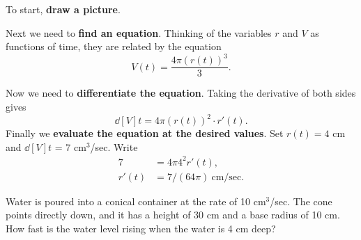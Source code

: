 \documentclass{ximera}
\begin{document}
\begin{solution}
To start, \textbf{draw a picture}.


Next we need to \textbf{find an equation}.  Thinking of the variables
$r$ and $V$ as functions of time, they are related by the equation
\[
V(t)=\frac{4\pi (r(t))^3}{3}.
\]

Now we need to \textbf{differentiate the equation}.  Taking the
derivative of both sides gives 
\[
\dd[V]{t}=4\pi (r(t))^2\cdot r'(t).
\]  
Finally we \textbf{evaluate the equation at the desired values}. Set
$r(t)= 4$ cm and $\dd[V]{t}$ = 7 cm$^3$/sec. Write 
\begin{align*}
7 &=4\pi 4^2r'(t),\\
r'(t) &=7/(64\pi)~\text{cm/sec}.
\end{align*}
\end{solution}

\begin{example} Water is poured into a conical container at the rate of 10
cm${}^3$/sec.  The cone points directly down, and it has a height of
30 cm and a base radius of 10 cm.  How fast is the water level rising
when the water is 4 cm deep?
\end{example}
\end{document}

